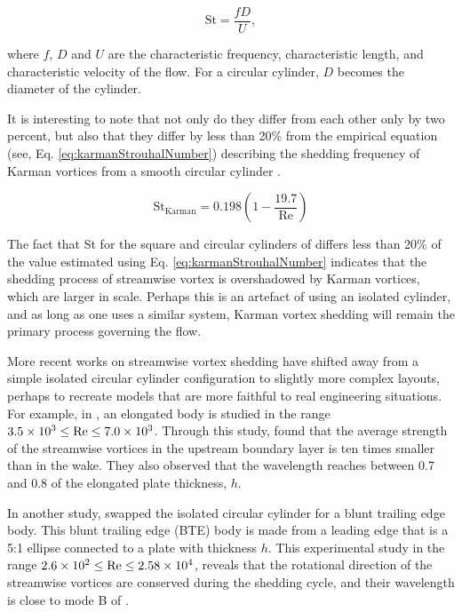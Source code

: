 \documentclass[oneside]{utmthesis}
\begin{document}
\begin{equation}
  \text{St} = \frac{f D}{U},
  \label{eq:stDef}
\end{equation}

\noindent where $f$, $D$ and $U$ are the characteristic frequency, characteristic length, and characteristic velocity of the flow. For a circular cylinder, $D$ becomes the diameter of the cylinder.

It is interesting to note that not only do they differ from each other only by two percent, but also that they differ by less than 20\% from the empirical equation (see, Eq. \ref{eq:karmanStrouhalNumber}) describing the shedding frequency of Karman vortices from a smooth circular cylinder \citep{Blevins1990}.

\begin{equation}
  \text{St}_{\text{Karman}} = 0.198 \left( 1 - \frac{19.7}{\text{Re}} \right)
  \label{eq:karmanStrouhalNumber}
\end{equation}

The fact that St for the square and circular cylinders of \citet{Agbaglah2019} differs less than 20\% of the value estimated using Eq. \ref{eq:karmanStrouhalNumber} indicates that the shedding process of streamwise vortex is overshadowed by Karman vortices, which are larger in scale. Perhaps this is an artefact of using an isolated cylinder, and as long as one uses a similar system, Karman vortex shedding will remain the primary process governing the flow.

More recent works on streamwise vortex shedding have shifted away from a simple isolated circular cylinder configuration to slightly more complex layouts, perhaps to recreate models that are more faithful to real engineering situations. For example, in \citet{Gibeau2018}, an elongated body is studied in the range $3.5 \times 10^{3} \leq \text{Re} \leq 7.0 \times 10^{3}$. Through this study, \citet{Gibeau2018} found that the average strength of the streamwise vortices in the upstream boundary layer is ten times smaller than in the wake. They also observed that the wavelength reaches between 0.7 and 0.8 of the elongated plate thickness, $h$.

 In another study, \citet{Gibeau2019} swapped the isolated circular cylinder for a blunt trailing edge body. This blunt trailing edge (BTE) body is made from a leading edge that is a 5:1 ellipse connected to a plate with thickness $h$. This experimental study in the range $2.6 \times 10^{2} \leq \text{Re} \leq 2.58 \times 10^{4}$, reveals that the rotational direction of the streamwise vortices are conserved during the shedding cycle, and their wavelength is close to mode B of \citet{Williamson1996a}.
\end{document}
